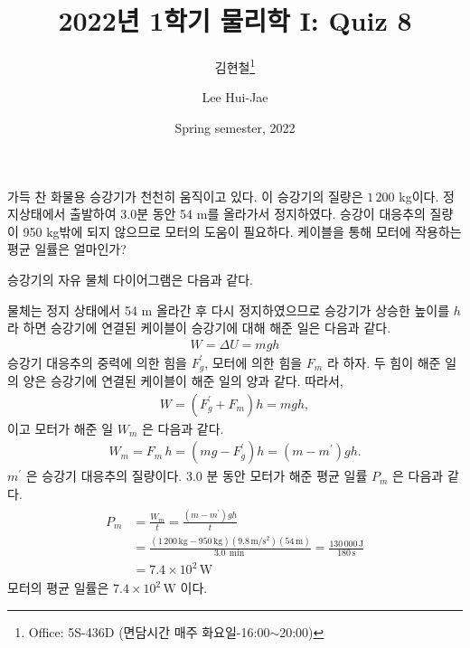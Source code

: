 \documentclass[floatfix,nofootinbib,superscriptaddress,fleqn]{revtex4-2}
\begin{document}
\title{\Large 2022년 1학기 물리학 I: Quiz 8}
\author{김현철\footnote{Office: 5S-436D (면담시간 매주
    화요일-16:00$\sim$20:00)}} 
\author{Lee Hui-Jae} 

\date{Spring semester, 2022}

\maketitle

가득 찬 화물용 승강기가 천천히 움직이고
있다. 이 승강기의 질량은 $1\,200$ kg이다. 정지상태에서 출발하여 3.0분
동안 54 m를 올라가서 정지하였다. 승강이 대응추의 질량이 950 kg밖에
되지 않으므로 모터의 도움이 필요하다. 케이블을 통해 모터에 작용하는
평균 일률은 얼마인가?

 승강기의 자유 물체 다이어그램은 다음과 같다.
\begin{figure}[htbp]
  \centering
\end{figure}
물체는 정지 상태에서 54 m 올라간 후 다시 정지하였으므로 승강기가 상승한 높이를 
$h$ 라 하면 승강기에 연결된 케이블이 승강기에 대해 해준 일은 다음과 같다.
\begin{align}
  W = \Delta U = mgh
\end{align}
승강기 대응추의 중력에 의한 힘을 $F_g^\prime$, 모터에 의한 힘을 $F_m$ 라 하자.
두 힘이 해준 일의 양은 승강기에 연결된 케이블이 해준 일의 양과 같다. 따라서,
\begin{align}
  W = (F_g^\prime+F_m)h = mgh  ,
\end{align}
이고 모터가 해준 일 $W_m$ 은 다음과 같다.
\begin{align}
  W_m = F_m\,h=(mg-F_g^\prime)h = (m-m^\prime)gh.
\end{align}
$m^\prime$ 은 승강기 대응추의 질량이다. 
3.0 분 동안 모터가 해준 평균 일률 $P_m$ 은 다음과 같다.
\begin{align}
  \begin{split}
    P_m &= \frac{W_m}{t} = \frac{(m-m^\prime)gh}{t}  \\
    &= \frac{(1\,200\,\mathrm{kg}-950\,\mathrm{kg})
    (9.8\,\mathrm{m/s^2})(54\,\mathrm{m})}{3.0\,\mathrm{\min}}
    =\frac{130\,000\,\mathrm{J}}{180\,\mathrm{s}} \\
    &= 7.4\times 10^2\,\mathrm{W}
  \end{split}
\end{align}
모터의 평균 일률은 $7.4\times 10^2\,\mathrm{W}$ 이다.
\end{document}
